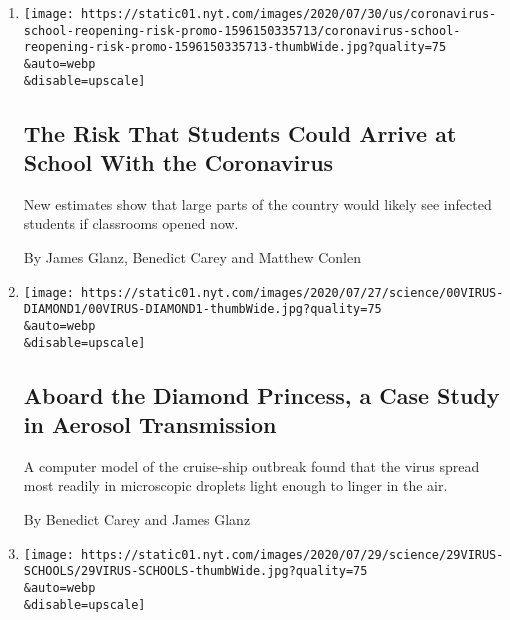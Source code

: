 \begin{enumerate}
\def\labelenumi{\arabic{enumi}.}
\item
  \href{/interactive/2020/07/31/us/coronavirus-school-reopening-risk.html}{}

  \texttt{[image: https://static01.nyt.com/images/2020/07/30/us/coronavirus-school-reopening-risk-promo-1596150335713/coronavirus-school-reopening-risk-promo-1596150335713-thumbWide.jpg?quality=75\\\&auto=webp\\\&disable=upscale]}

  \hypertarget{the-risk-that-students-could-arrive-at-school-with-the-coronavirus}{%
  \subsection{The Risk That Students Could Arrive at School With the
  Coronavirus}\label{the-risk-that-students-could-arrive-at-school-with-the-coronavirus}}

  New estimates show that large parts of the country would likely see
  infected students if classrooms opened now.

  By James Glanz, Benedict Carey and Matthew Conlen
\item
  \href{/2020/07/30/health/diamond-princess-coronavirus-aerosol.html}{}

  \texttt{[image: https://static01.nyt.com/images/2020/07/27/science/00VIRUS-DIAMOND1/00VIRUS-DIAMOND1-thumbWide.jpg?quality=75\\\&auto=webp\\\&disable=upscale]}

  \hypertarget{aboard-the-diamond-princess-a-case-study-in-aerosol-transmission}{%
  \subsection{Aboard the Diamond Princess, a Case Study in Aerosol
  Transmission}\label{aboard-the-diamond-princess-a-case-study-in-aerosol-transmission}}

  A computer model of the cruise-ship outbreak found that the virus
  spread most readily in microscopic droplets light enough to linger in
  the air.

  By Benedict Carey and James Glanz
\item
  \href{/2020/07/29/health/covid-school-reopening.html}{}

  \texttt{[image: https://static01.nyt.com/images/2020/07/29/science/29VIRUS-SCHOOLS/29VIRUS-SCHOOLS-thumbWide.jpg?quality=75\\\&auto=webp\\\&disable=upscale]}

  \hypertarget{school-closures-in-the-spring-saved-lives-study-asserts}{%
}
\end{enumerate}
